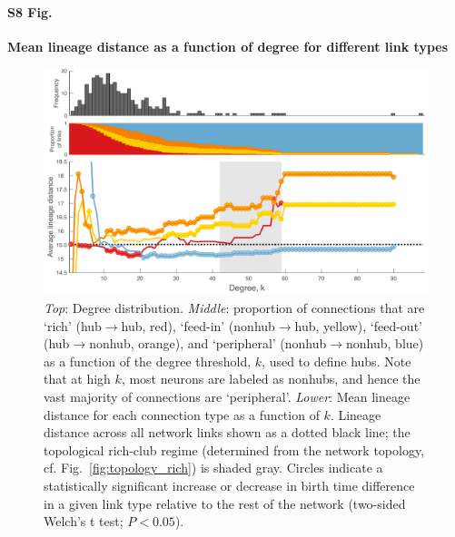 \documentclass[10pt,letterpaper]{article}
\begin{document}
\paragraph*{S8 Fig.}
{\bf Mean lineage distance as a function of degree for different link types}
\begin{figure}[!h]

\centering
    \includegraphics[width=1\textwidth]{Lineage.pdf}
    \caption{\emph{Top}: Degree distribution.
\emph{Middle}: proportion of connections that are `rich' (hub$\rightarrow$hub, red), `feed-in' (nonhub$\rightarrow$hub, yellow), `feed-out' (hub$\rightarrow$nonhub, orange), and `peripheral' (nonhub$\rightarrow$nonhub, blue) as a function of the degree threshold, $k$, used to define hubs.
Note that at high $k$, most neurons are labeled as nonhubs, and hence the vast majority of connections are `peripheral'.
\emph{Lower}: Mean lineage distance for each connection type as a function of $k$.
Lineage distance across all network links shown as a dotted black line; the topological rich-club regime (determined from the network topology, cf. Fig.~\ref{fig:topology_rich}) is shaded gray.
Circles indicate a statistically significant increase or decrease in birth time difference in a given link type relative to the rest of the network (two-sided Welch’s t test; $P < 0.05$).
}
\label{Lineagek}
\end{figure}
\end{document}
